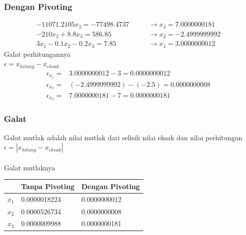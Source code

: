 \documentclass{beamer}
\begin{document}
\begin{frame}
\frametitle{Dengan Pivoting}
\begin{equation}
\begin{split}
-11071.2105x_3 = -77498.4737 \qquad&\rightarrow x_3=\boxed{7.0000000181}
\\-210x_2+8.8x_3=586.85 \  &\rightarrow x_2=\boxed{-2.4999999992}
\\3x_1-0.1x_2-0.2x_3=7.85 \  &\rightarrow x_1=\boxed{3.0000000012}
\end{split}
\nonumber
\end{equation}
Galat perhitungannya
\\$\epsilon=x_{hitung}-x_{eksak}$ 
\begin{equation}
\begin{split}
\epsilon_{x_1}=& 3.0000000012-3 = 0.0000000012
\\\epsilon_{x_2}=& (-2.4999999992)-(-2.5) = 0.0000000008
\\\epsilon_{x_3}=& 7.0000000181-7 = 0.0000000181
\end{split}
\nonumber
\end{equation}

\end{frame}


\begin{frame}
\frametitle{Galat}
Galat mutlak adalah nilai mutlak dari selisih nilai eksak dan nilai perhitungan
\\$\epsilon=|x_{hitung}-x_{eksak}|$
\\\ \\Galat mutlaknya
\begin{center}
\begin{tabular}{|l|l|l|}
\hline
	 & Tanpa Pivoting & Dengan Pivoting\\
\hline
	$x_1$ & 0.0000018224 & 0.0000000012\\
\hline  
	$x_2$ & 0.0000526734 & 0.0000000008\\
\hline
	$x_3$ & 0.0000009988 & 0.0000000181\\
\hline
\end{tabular}
\end{center}
\end{frame}

\end{document}
